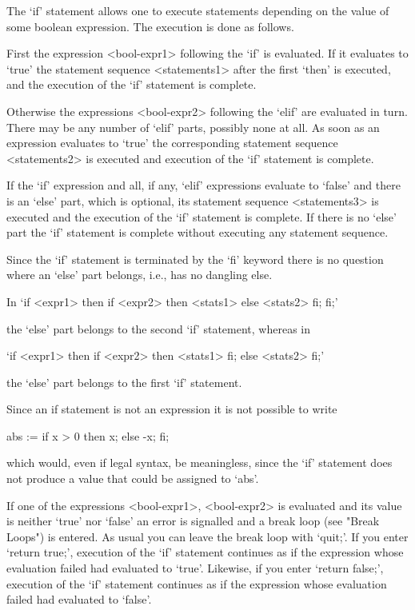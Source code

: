 The `if' statement allows one to execute statements depending on the
value of some boolean expression. The execution is done as follows.

First the expression <bool-expr1> following the `if' is evaluated. If it
evaluates to `true' the statement sequence <statements1> after the first
`then' is executed, and the execution of the `if' statement is complete.

Otherwise the expressions <bool-expr2> following the `elif' are evaluated
in turn. There may be any number of `elif' parts, possibly none at all.
As soon as an expression evaluates to `true' the corresponding statement
sequence <statements2> is executed and execution of the `if' statement is
complete.

If the `if' expression and all, if any, `elif' expressions evaluate to
`false' and there is an `else' part, which is optional, its statement
sequence <statements3> is executed  and the  execution of  the `if'
statement is complete. If there is no `else' part the `if' statement is
complete without executing any statement sequence.

Since the `if' statement is terminated by the `fi' keyword there is no
question where an `else' part belongs, i.e., {\GAP} has no dangling else.

In `if <expr1> then if <expr2> then <stats1> else <stats2> fi; fi;'

the `else' part belongs to the second  `if' statement, whereas in

`if <expr1> then if <expr2> then <stats1> fi; else <stats2> fi;'

the `else' part belongs to the first `if' statement.

Since an if statement is not an expression it is not possible to write

\beginexample
abs := if x > 0 then x; else -x; fi;
\endexample

which would, even if legal syntax, be  meaningless, since the `if'
statement does not produce a value that could be assigned to `abs'.

If one of the expressions <bool-expr1>, <bool-expr2> is evaluated
and its value is neither `true' nor `false' an error is signalled
and a break loop (see "Break Loops") is entered. As usual you
can leave  the break loop with `quit;'.  If you enter `return true;',
execution of the `if' statement continues as if the expression whose
evaluation  failed had evaluated to `true'.   Likewise, if you enter
`return false;', execution of the `if' statement continues as if the
expression whose evaluation failed had evaluated to `false'.

